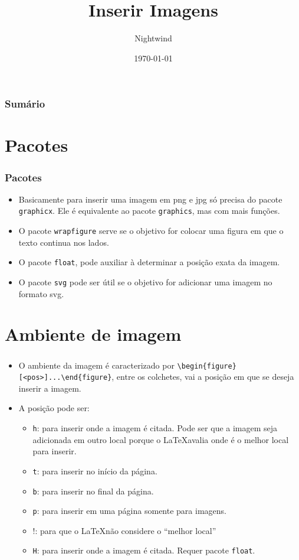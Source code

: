 \documentclass{beamer}
\title{Inserir Imagens}
\author{Nightwind}
\institute[CTISM]{Colégio Técnico Industrial de Santa Maria}
\date{\today}
\begin{document}
\frame{\titlepage}

\begin{frame}
    \frametitle{Sumário}
    \tableofcontents
\end{frame}

\section{Pacotes}

\begin{frame}[fragile]
    \frametitle{Pacotes}

    \begin{itemize}
        \item Basicamente para inserir uma imagem em png e jpg só precisa do pacote \texttt{graphicx}. Ele é equivalente ao pacote \texttt{graphics}, mas com mais funções.
        \item O pacote \texttt{wrapfigure} serve se o objetivo for colocar uma figura em que o texto continua nos lados.
        \item O pacote \texttt{float}, pode auxiliar à determinar a posição exata da imagem.
        \item O pacote \texttt{svg} pode ser útil se o objetivo for adicionar uma imagem no formato svg.
    \end{itemize}

\end{frame}

\section{Ambiente de imagem}

\begin{frame}[fragile]
    \frametitle{}
    \begin{itemize}
        \item O ambiente da imagem é caracterizado por \lstinline[style=myStyleLatex]!\begin{figure}[<pos>]...\end{figure}!, entre os colchetes, vai a posição em que se deseja inserir a imagem.
        \item A posição pode ser:
              \begin{itemize}
                  \item \texttt{h}: para inserir onde a imagem é citada. Pode ser que a imagem seja adicionada em outro local porque o \LaTeX avalia onde é o melhor local para inserir.
                  \item \texttt{t}: para inserir no início da página.
                  \item \texttt{b}: para inserir no final da página.
                  \item \texttt{p}: para inserir em uma página somente para imagens.
                  \item !: para que o \LaTeX não considere o ``melhor local''
                  \item \texttt{H}: para inserir onde a imagem é citada. Requer pacote \texttt{float}.
              \end{itemize}
    \end{itemize}
\end{frame}
\end{document}
